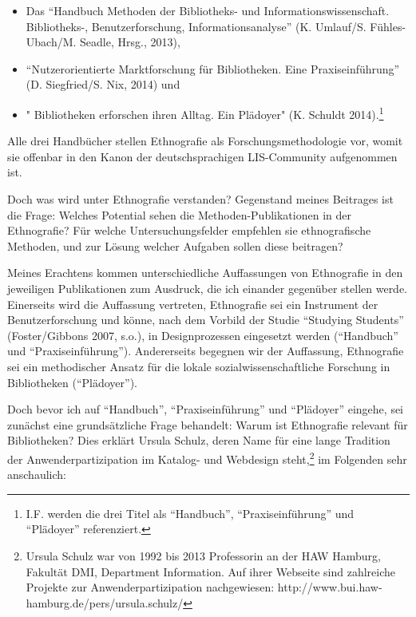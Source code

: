 \documentclass[a4paper,
fontsize=11pt,
oneside,
numbers=noperiodatend,
parskip=half-,
bibliography=totoc,
final
]{scrartcl}
\begin{document}
\begin{itemize}
\item
  Das \enquote{Handbuch Methoden der Bibliotheks- und
  Informationswissenschaft. Bibliotheks-, Benutzerforschung,
  Informationsanalyse} (K. Umlauf/S. Fühles-Ubach/M. Seadle, Hrsg.,
  2013),
\item
  \enquote{Nutzerorientierte Marktforschung für Bibliotheken. Eine
  Praxiseinführung} (D. Siegfried/S. Nix, 2014) und
\item
  " Bibliotheken erforschen ihren Alltag. Ein Plädoyer" (K. Schuldt
  2014).\footnote{I.F. werden die drei Titel als \enquote{Handbuch},
    \enquote{Praxiseinführung} und \enquote{Plädoyer} referenziert.}
\end{itemize}

Alle drei Handbücher stellen Ethnografie als Forschungsmethodologie vor,
womit sie offenbar in den Kanon der deutschsprachigen LIS-Community
aufgenommen ist.

Doch was wird unter Ethnografie verstanden? Gegenstand meines Beitrages
ist die Frage: Welches Potential sehen die Methoden-Publikationen in der
Ethnografie? Für welche Untersuchungsfelder empfehlen sie ethnografische
Methoden, und zur Lösung welcher Aufgaben sollen diese beitragen?

Meines Erachtens kommen unterschiedliche Auffassungen von Ethnografie in
den jeweiligen Publikationen zum Ausdruck, die ich einander gegenüber
stellen werde. Einerseits wird die Auffassung vertreten, Ethnografie sei
ein Instrument der Benutzerforschung und könne, nach dem Vorbild der
Studie \enquote{Studying Students} (Foster/Gibbons 2007, s.o.), in
Designprozessen eingesetzt werden (\enquote{Handbuch} und
\enquote{Praxiseinführung}). Andererseits begegnen wir der Auffassung,
Ethnografie sei ein methodischer Ansatz für die lokale
sozialwissenschaftliche Forschung in Bibliotheken (\enquote{Plädoyer}).

Doch bevor ich auf \enquote{Handbuch}, \enquote{Praxiseinführung} und
\enquote{Plädoyer} eingehe, sei zunächst eine grundsätzliche Frage
behandelt: Warum ist Ethnografie relevant für Bibliotheken? Dies erklärt
Ursula Schulz, deren Name für eine lange Tradition der
Anwenderpartizipation im Katalog- und Webdesign steht,\footnote{Ursula
  Schulz war von 1992 bis 2013 Professorin an der HAW Hamburg, Fakultät
  DMI, Department Information. Auf ihrer Webseite sind zahlreiche
  Projekte zur Anwenderpartizipation nachgewiesen:
  http://www.bui.haw-hamburg.de/pers/ursula.schulz/} im Folgenden sehr
anschaulich:
\end{document}
